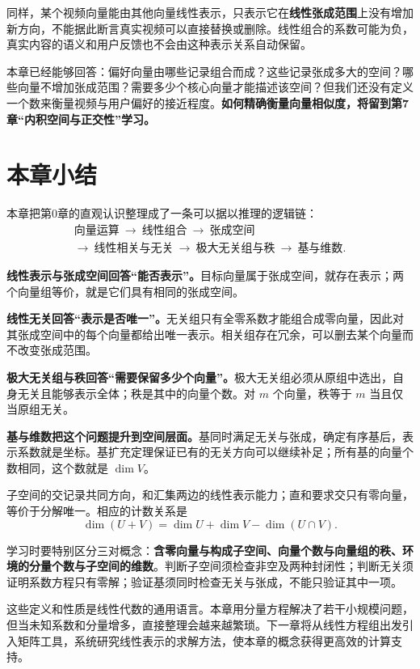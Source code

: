 \documentclass[a4paper,12pt,twoside,openany,fontset=none]{ctexbook}
\numberwithin{equation}{chapter}
\begin{document}
同样，某个视频向量能由其他向量线性表示，只表示它在\textbf{线性张成范围}上没有增加新方向，不能据此断言真实视频可以直接替换或删除。线性组合的系数可能为负，真实内容的语义和用户反馈也不会由这种表示关系自动保留。

本章已经能够回答：偏好向量由哪些记录组合而成？这些记录张成多大的空间？哪些向量不增加张成范围？需要多少个核心向量才能描述该空间？但我们还没有定义一个数来衡量视频与用户偏好的接近程度。\textbf{如何精确衡量向量相似度，将留到第7章“内积空间与正交性”学习。}

\clearpage
\section*{本章小结}

本章把第0章的直观认识整理成了一条可以据以推理的逻辑链：
\[
\begin{gathered}
    \text{向量运算}\ \longrightarrow\ \text{线性组合}\ \longrightarrow\ \text{张成空间}\\[4pt]
    \longrightarrow\ \text{线性相关与无关}\ \longrightarrow\ \text{极大无关组与秩}
    \ \longrightarrow\ \text{基与维数}.
\end{gathered}
\]

\textbf{线性表示与张成空间回答“能否表示”。}目标向量属于张成空间，就存在表示；两个向量组等价，就是它们具有相同的张成空间。

\textbf{线性无关回答“表示是否唯一”。}无关组只有全零系数才能组合成零向量，因此对其张成空间中的每个向量都给出唯一表示。相关组存在冗余，可以删去某个向量而不改变张成范围。

\textbf{极大无关组与秩回答“需要保留多少个向量”。}极大无关组必须从原组中选出，自身无关且能够表示全体；秩是其中的向量个数。对 $m$ 个向量，秩等于 $m$ 当且仅当原组无关。

\textbf{基与维数把这个问题提升到空间层面。}基同时满足无关与张成，确定有序基后，表示系数就是坐标。基扩充定理保证已有的无关方向可以继续补足；所有基的向量个数相同，这个数就是 $\dim V$。

子空间的交记录共同方向，和汇集两边的线性表示能力；直和要求交只有零向量，等价于分解唯一。相应的计数关系是
\[
    \dim(U+V)=\dim U+\dim V-\dim(U\cap V).
\]

学习时要特别区分三对概念：\textbf{含零向量与构成子空间、向量个数与向量组的秩、环境的分量个数与子空间的维数}。判断子空间须检查非空及两种封闭性；判断无关须证明系数方程只有零解；验证基须同时检查无关与张成，不能只验证其中一项。

这些定义和性质是线性代数的通用语言。本章用分量方程解决了若干小规模问题，但当未知系数和分量增多，直接整理会越来越繁琐。下一章将从线性方程组出发引入矩阵工具，系统研究线性表示的求解方法，使本章的概念获得更高效的计算支持。
\end{document}
